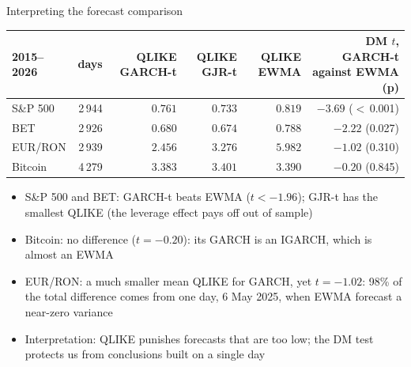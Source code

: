 \begin{frame}{Interpreting the forecast comparison}
\itemsize{\footnotesize}
\begin{center}
\scriptsize
\begin{tabular}{lrrrrr}
\toprule
2015--2026 & days & QLIKE GARCH-t & QLIKE GJR-t & QLIKE EWMA & DM $t$, GARCH-t against EWMA (p) \\
\midrule
S\&P 500 & 2\,944 & $0.761$ & $0.733$ & $0.819$ & ${\ensuremath{-}3.69}$ ($<$\,0.001) \\
BET & 2\,926 & $0.680$ & $0.674$ & $0.788$ & ${\ensuremath{-}2.22}$ (0.027) \\
EUR/RON & 2\,939 & $2.456$ & $3.276$ & $5.982$ & ${\ensuremath{-}1.02}$ (0.310) \\
Bitcoin & 4\,279 & $3.383$ & $3.401$ & $3.390$ & ${\ensuremath{-}0.20}$ (0.845) \\
\bottomrule
\end{tabular}
\end{center}
\begin{itemize}
    \item S\&P 500 and BET: GARCH-t beats EWMA ($t < -1.96$); GJR-t has the smallest QLIKE (the leverage effect pays off out of sample)
    \item Bitcoin: no difference ($t = \ensuremath{-}0.20$): its GARCH is an IGARCH, which is almost an EWMA
    \item EUR/RON: a much smaller mean QLIKE for GARCH, yet $t = \ensuremath{-}1.02$: 98\% of the total difference comes from one day, 6 May 2025, when EWMA forecast a near-zero variance
    \item Interpretation: QLIKE punishes forecasts that are too low; the DM test protects us from conclusions built on a single day
\end{itemize}
\end{frame}

